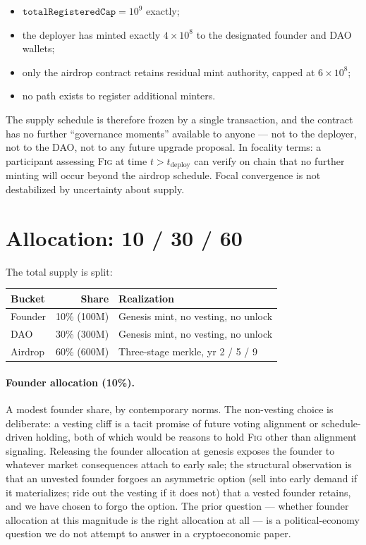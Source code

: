 \documentclass[11pt,a4paper]{article}
\theoremstyle{definition}
\theoremstyle{remark}
\newcommand{\fig}{\textsc{Fig}}
\begin{document}
\begin{itemize}
  \item $\texttt{totalRegisteredCap} = 10^9$ exactly;
  \item the deployer has minted exactly $4 \times 10^8$ to the
    designated founder and DAO wallets;
  \item only the airdrop contract retains residual mint
    authority, capped at $6 \times 10^8$;
  \item no path exists to register additional minters.
\end{itemize}

The supply schedule is therefore frozen by a single transaction,
and the contract has no further ``governance moments'' available
to anyone --- not to the deployer, not to the DAO, not to any
future upgrade proposal. In focality terms: a participant
assessing \fig{} at time $t > t_{\text{deploy}}$ can verify on
chain that no further minting will occur beyond the airdrop
schedule. Focal convergence is not destabilized by uncertainty
about supply.

\section{Allocation: 10 / 30 / 60}
\label{sec:allocation}

The total supply is split:

\begin{center}
\begin{tabular}{lrl}
\toprule
\textbf{Bucket} & \textbf{Share} & \textbf{Realization} \\
\midrule
Founder      & 10\% (100M)  & Genesis mint, no vesting, no unlock \\
DAO          & 30\% (300M)  & Genesis mint, no vesting, no unlock \\
Airdrop      & 60\% (600M)  & Three-stage merkle, yr 2 / 5 / 9 \\
\bottomrule
\end{tabular}
\end{center}

\paragraph{Founder allocation (10\%).}
A modest founder share, by contemporary norms. The non-vesting
choice is deliberate: a vesting cliff is a tacit promise of
future voting alignment or schedule-driven holding, both of which
would be reasons to hold \fig{} other than alignment signaling.
Releasing the founder allocation at genesis exposes the founder
to whatever market consequences attach to early sale; the
structural observation is that an unvested founder forgoes an
asymmetric option (sell into early demand if it materializes;
ride out the vesting if it does not) that a vested founder
retains, and we have chosen to forgo the option. The prior
question --- whether founder allocation at this magnitude is the
right allocation at all --- is a political-economy question we
do not attempt to answer in a cryptoeconomic paper.
\end{document}

